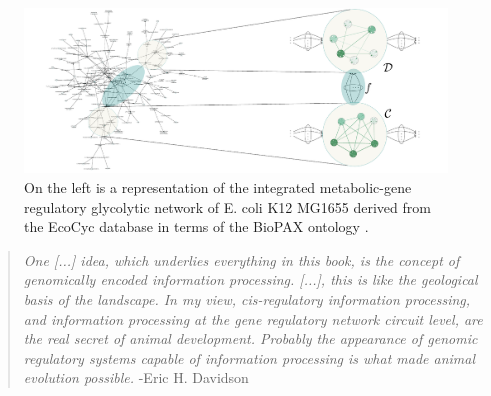\begin{frame}
\begin{figure}
\noindent\includegraphics[width=1.0\framewidth]{fig/biograph.pdf}
\caption{%
On the left is a representation of the integrated metabolic-gene regulatory glycolytic network of E. coli K12 MG1655 derived from the EcoCyc database \cite{Keseler2011} in terms of the BioPAX ontology \cite{Demir2010}. 
}
\label{fig:biograph}
\end{figure}
\end{frame}

\begin{frame}
\begin{quotation}
{\it One [...] idea, which underlies everything in this book, is the concept
of genomically encoded information processing. [...],
this is like the geological basis of the landscape. In my view, cis-regulatory information processing, and information processing at the gene regulatory network circuit level, are the real secret of animal development. Probably the appearance of genomic regulatory systems capable of information processing is what made animal evolution possible.} -Eric H. Davidson \cite{Davidson2006a}
\end{quotation}
\end{frame}

